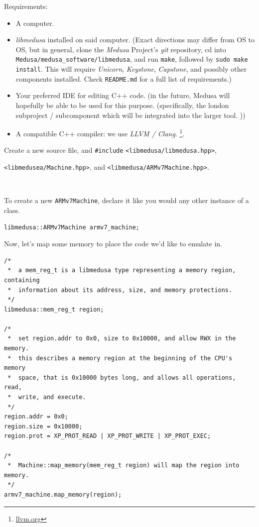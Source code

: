 \documentclass{article}
\newcommand{\Medusa}{\textit{Medusa}\xspace}
\begin{document}
	Requirements:
	\begin{itemize}
		\item A computer.

		\item \textit{libmedusa} installed on said computer. (Exact directions
		may differ from OS to OS, but in general, clone the \Medusa Project's
		\textit{git} repository, cd into
		\texttt{Medusa/medusa\_software/libmedusa}, and run \texttt{make},
		followed by \texttt{sudo make install}. This will require
		\textit{Unicorn}, \textit{Keystone}, \textit{Capstone}, and possibly
		other components installed. Check \texttt{README.md} for a full list of
		requirements.)

		\item Your preferred IDE for editing C++ code. (in the future, Medusa
		will hopefully be able to be used for this purpose. (specifically, the
		london subproject / subcomponent which will be integrated into the
		larger tool. ))

		\item A compatible C++ compiler: we use \textit{LLVM / Clang}.
		\footnote{
			\label{llvm_clang1}
			\href{https://www.llvm.org}{llvm.org}
		}.
	\end{itemize}

	Create a new source file, and \texttt{\#include}
	\texttt{<libmedusa/libmedusa.hpp>}, \

	\texttt{<libmedusea/Machine.hpp>}, and \texttt{<libmedusa/ARMv7Machine.hpp>}.
	\
	
	\

	To create a new \texttt{ARMv7Machine}, declare it like you would any other
	instance of a class.

	\begin{lstlisting}
libmedusa::ARMv7Machine armv7_machine;
	\end{lstlisting}

	Now, let's map some memory to place the code we'd like to emulate in.

	\begin{lstlisting}
/*
 *  a mem_reg_t is a libmedusa type representing a memory region, containing
 *  information about its address, size, and memory protections.
 */
libmedusa::mem_reg_t region;

/*
 *  set region.addr to 0x0, size to 0x10000, and allow RWX in the memory.
 *  this describes a memory region at the beginning of the CPU's memory
 *  space, that is 0x10000 bytes long, and allows all operations, read,
 *  write, and execute.
 */
region.addr = 0x0;
region.size = 0x10000;
region.prot = XP_PROT_READ | XP_PROT_WRITE | XP_PROT_EXEC;

/*
 *  Machine::map_memory(mem_reg_t region) will map the region into memory.
 */
armv7_machine.map_memory(region);
\end{lstlisting}
\end{document}
